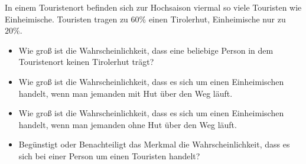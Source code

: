 
In einem Touristenort befinden sich zur Hochsaison viermal so viele Touristen
wie Einheimische. Touristen tragen zu $60\%$ einen Tirolerhut, Einheimische
nur zu $20\%$.

\begin{itemize}
	\item Wie groß ist die Wahrscheinlichkeit, dass eine beliebige
		Person in dem Touristenort keinen Tirolerhut trägt?
	\item Wie groß ist die Wahrscheinlichkeit, dass es sich um einen Einheimischen
		handelt, wenn man jemanden mit Hut über den Weg läuft.
	\item Wie groß ist die Wahrscheinlichkeit, dass es sich um einen Einheimischen
		handelt, wenn man jemanden ohne Hut über den Weg läuft.
	\item Begünstigt oder Benachteiligt das Merkmal  
		die Wahrscheinlichkeit, dass es sich bei einer Person um einen Touristen
		handelt?
\end{itemize}
